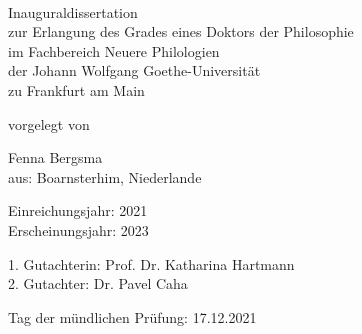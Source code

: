 \documentclass[hidelinks,a4paper,twoside,openright,14pt]{memoir}
\begin{document}

\frontmatter

\begin{titlingpage}

\center

\large

\thispagestyle{empty}
\phantom{xx}

\vspace{3em}

\thispagestyle{empty}

{\Large
{}}\\

\vspace{5em}

Inauguraldissertation\\
zur Erlangung des Grades eines Doktors der Philosophie\\
im Fachbereich Neuere Philologien\\
der Johann Wolfgang Goethe-Universität\\
zu Frankfurt am Main\\

\vspace{5em}

vorgelegt von\\

\vspace{2em}

Fenna Bergsma\\
aus: Boarnsterhim, Niederlande\\

\vspace{3em}

Einreichungsjahr: 2021\\
Erscheinungsjahr: 2023\\

\vspace{5em}

\normalsize

\thispagestyle{empty}

{\raggedright

1. Gutachterin: Prof. Dr. Katharina Hartmann\\
2. Gutachter: Dr. Pavel Caha\\

\thispagestyle{empty}

\vspace{1em}

Tag der mündlichen Prüfung: 17.12.2021


}
\end{titlingpage}
\end{document}
